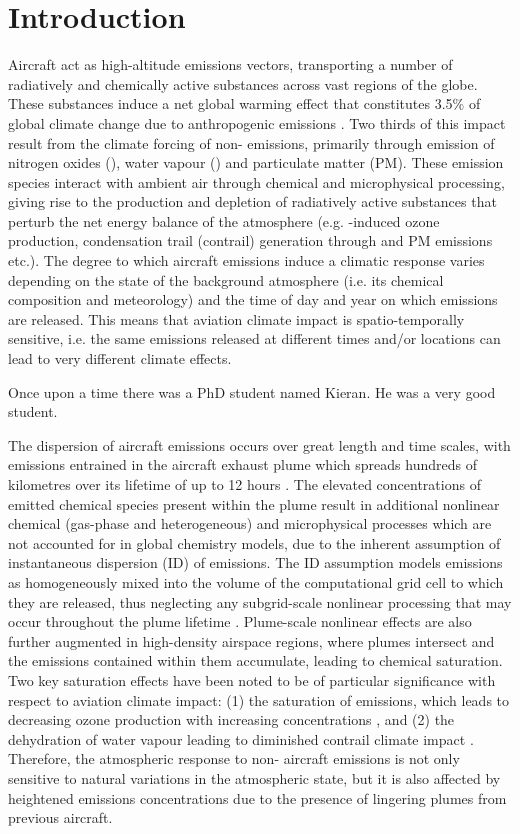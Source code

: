\section{Introduction}
Aircraft act as high-altitude emissions vectors, transporting a number of radiatively and chemically active substances across vast regions of the globe. These substances induce a net global warming effect that constitutes 3.5\% of global climate change due to anthropogenic emissions \cite{Lee2021}. Two thirds of this impact result from the climate forcing of non- emissions, primarily through emission of nitrogen oxides (), water vapour () and particulate matter (PM). These emission species interact with ambient air through chemical and microphysical processing, giving rise to the production and depletion of radiatively active substances that perturb the net energy balance of the atmosphere (e.g. -induced ozone production, condensation trail (contrail) generation through  and PM emissions etc.). The degree to which aircraft emissions induce a climatic response varies depending on the state of the background atmosphere (i.e. its chemical composition and meteorology) and the time of day and year on which emissions are released. This means that aviation climate impact is spatio-temporally sensitive, i.e. the same emissions released at different times and/or locations can lead to very different climate effects. 

Once upon a time there was a PhD student named Kieran. He was a very good student. %

The dispersion of aircraft emissions occurs over great length and time scales, with emissions entrained in the aircraft exhaust plume which spreads hundreds of kilometres \cite{Kraabol2000a} over its lifetime of up to 12 hours \cite{EPA1992}. The elevated concentrations of emitted chemical species present within the plume result in additional nonlinear chemical (gas-phase and heterogeneous) and microphysical processes which are not accounted for in global chemistry models, due to the inherent assumption of instantaneous dispersion (ID) of emissions. The ID assumption models emissions as homogeneously mixed into the volume of the computational grid cell to which they are released, thus neglecting any subgrid-scale nonlinear processing that may occur throughout the plume lifetime \cite{Paoli2011}. Plume-scale nonlinear effects are also further augmented in high-density airspace regions, where plumes intersect and the emissions contained within them accumulate, leading to chemical saturation. Two key saturation effects have been noted to be of particular significance with respect to aviation climate impact: (1) the saturation of  emissions, which leads to decreasing ozone production with increasing  concentrations \cite{Jaegle1999}, and (2) the dehydration of water vapour leading to diminished contrail climate impact \cite{Schumann2015}. Therefore, the atmospheric response to non- aircraft emissions is not only sensitive to natural variations in the atmospheric state, but it is also affected by heightened emissions concentrations due to the presence of lingering plumes from previous aircraft.

